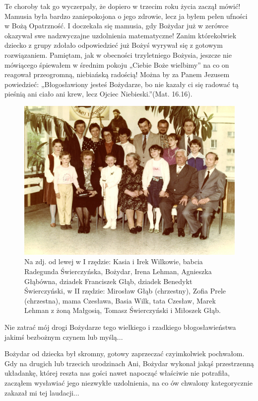 Te choroby tak go wyczerpały, że dopiero w trzecim roku życia zaczął mówić! Mamusia była bardzo zaniepokojona o jego zdrowie, lecz ja byłem pełen ufności w Bożą Opatrzność. I doczekała się mamusia, gdy Bożydar już w zerówce okazywał swe nadzwyczajne uzdolnienia matematyczne! Zanim którekolwiek dziecko z grupy zdołało odpowiedzieć już Bożyś wyrywał się z gotowym rozwiązaniem. Pamiętam, jak w obecności trzyletniego Bożysia, jeszcze nie mówiącego śpiewałem w średnim pokoju „Ciebie Boże wielbimy” na co on reagował przeogromną, niebiańską radością! Można by za Panem Jezusem powiedzieć: „Błogosławiony jesteś Bożydarze, bo nie kazały ci się radować tą pieśnią ani ciało ani krew, lecz Ojciec Niebieski.”(Mat. 16.16).
\begin{figure}[!h]
\begin{center}
\includegraphics[width=\textwidth]{photo/bozydar_swierczynski_komunia_2.jpg}
\caption[I Komunia św. Bożydara -- zdjęcie zbiorowe]{Na zdj. od lewej w I rzędzie: Kasia i Irek Wilkowie, babcia Radegunda Świerczyńska, Bożydar, Irena Lehman, Agnieszka Głąbówna, dziadek Franciszek Głąb, dziadek Benedykt Świerczyński, w II rzędzie: Mirosław Głąb (chrzestny), Zofia Prele (chrzestna), mama Czesława, Basia Wilk, tata Czesław, Marek Lehman z żoną Małgosią, Tomasz Świerczyński i Miłoszek Głąb.}
\end{center}
\end{figure}

Nie zatrać mój drogi Bożydarze tego wielkiego i rzadkiego błogosławieństwa jakimś bezbożnym czynem lub myślą...

Bożydar od dziecka był skromny, gotowy zaprzeczać czyimkolwiek pochwałom. Gdy na drugich lub trzecich urodzinach Ani, Bożydar wykonał jakąś przestrzenną układankę, której reszta nas gości nawet napocząć właściwie nie potrafiła, zacząłem wysławiać jego niezwykłe uzdolnienia, na co ów chwalony kategorycznie zakazał mi tej laudacji...

